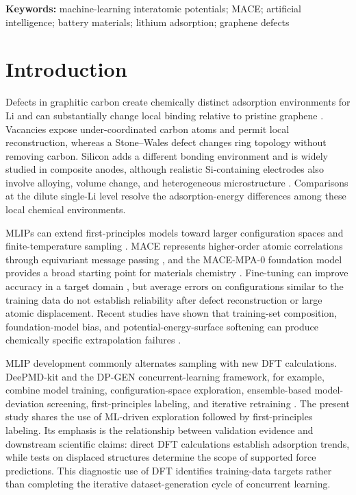 \documentclass[12pt]{article}
\begin{document}
\begin{flushleft}
\textbf{Keywords:} machine-learning interatomic potentials; MACE; artificial intelligence; battery materials; lithium adsorption; graphene defects
\end{flushleft}

\section{Introduction}

Defects in graphitic carbon create chemically distinct adsorption environments
for Li and can substantially change local binding relative to pristine graphene
\citep{uthaisar2010edge,zhou2012graphene,yildirim2014defect}. Vacancies expose
under-coordinated carbon atoms and permit local reconstruction, whereas a
Stone--Wales defect changes ring topology without removing carbon. Silicon adds
a different bonding environment and is widely studied in composite anodes,
although realistic Si-containing electrodes also involve alloying, volume
change, and heterogeneous microstructure \citep{obrovac2014alloy,sehrawat2021silicongraphene,palumbo2019siliconflg}.
Comparisons at the dilute single-Li level resolve the adsorption-energy
differences among these local chemical environments.

MLIPs can extend first-principles models toward larger configuration spaces and
finite-temperature sampling \citep{jacobs2025mlipguide}. MACE represents
higher-order atomic correlations through equivariant message passing
\citep{batatia2022mace}, and the MACE-MPA-0 foundation model provides a broad
starting point for materials chemistry \citep{batatia2025foundation}. Fine-tuning
can improve accuracy in a target domain \citep{radova2025finetuning}, but average
errors on configurations similar to the training data do not establish
reliability after defect reconstruction or large atomic displacement. Recent
studies have shown that training-set composition, foundation-model bias, and
potential-energy-surface softening can produce chemically specific
extrapolation failures \citep{niblett2025transferability,wong2026bias,deng2025softening}.

MLIP development commonly alternates sampling with new DFT calculations.
DeePMD-kit and the
DP-GEN concurrent-learning framework, for example, combine model training,
configuration-space exploration, ensemble-based model-deviation screening,
first-principles labeling, and iterative retraining
\citep{wang2018deepmd,zhang2020dpgen}. The present study shares the use of
ML-driven exploration followed by first-principles labeling. Its emphasis is
the relationship between validation evidence and downstream scientific claims:
direct DFT calculations establish adsorption trends, while tests on displaced
structures determine the scope of supported force predictions. This diagnostic
use of DFT identifies training-data targets rather than completing the
iterative dataset-generation cycle of concurrent learning.
\end{document}
